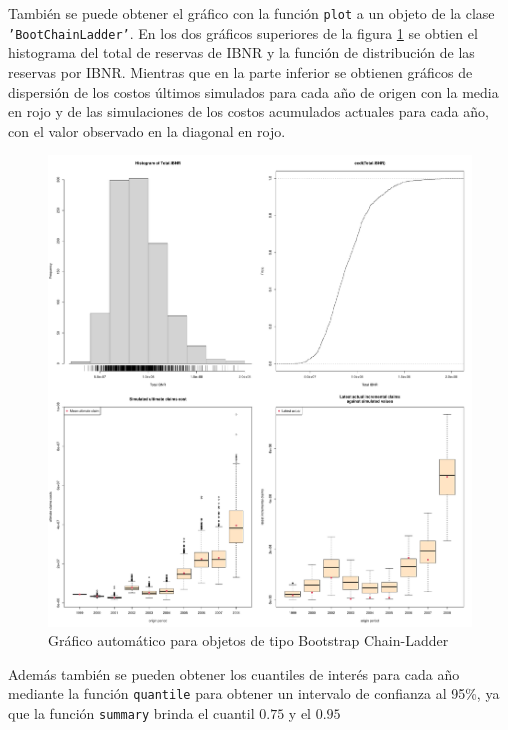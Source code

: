 \documentclass[
  12pt,
]{article}
\begin{document}
También se puede obtener el gráfico con la función \texttt{plot} a un
objeto de la clase \texttt{'BootChainLadder'}. En los dos gráficos
superiores de la figura \ref{plotBoot} se obtien el histograma del total
de reservas de IBNR y la función de distribución de las reservas por
IBNR. Mientras que en la parte inferior se obtienen gráficos de
dispersión de los costos últimos simulados para cada año de origen con
la media en rojo y de las simulaciones de los costos acumulados actuales
para cada año, con el valor observado en la diagonal en rojo.

\begin{figure}
\centering
\includegraphics{informe_files/figure-latex/unnamed-chunk-36-1.pdf}
\caption{\label{plotBoot} Gráfico automático para objetos de tipo
Bootstrap Chain-Ladder}
\end{figure}

Además también se pueden obtener los cuantiles de interés para cada año
mediante la función \texttt{quantile} para obtener un intervalo de
confianza al 95\%, ya que la función \texttt{summary} brinda el cuantil
\(0.75\) y el \(0.95\)
\end{document}
